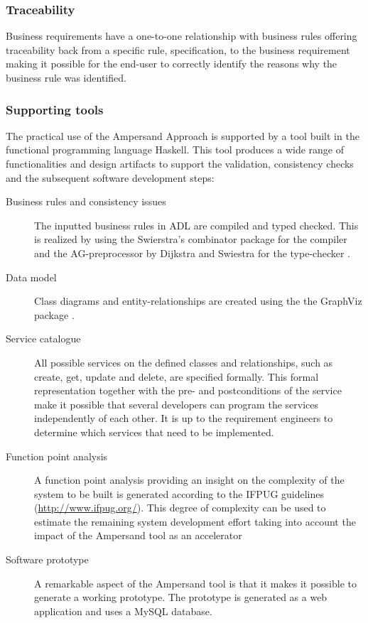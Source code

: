\subsubsection{Traceability}
Business requirements have a one-to-one relationship with business rules offering traceability back from a specific rule, specification, to the business requirement making it possible for the end-user to correctly identify the reasons why the business rule was identified.

\subsubsection{Supporting tools}
The practical use of the Ampersand Approach is supported by a tool built in the functional programming language Haskell. 
This tool produces a wide range of functionalities and design artifacts to support the validation, consistency checks and the subsequent software development steps:
\begin{description}
	\item[Business rules and consistency issues] The inputted business rules in ADL are compiled and typed checked.
	This is realized by using the Swierstra's combinator package for the compiler   and the AG-preprocessor by Dijkstra and Swiestra for the type-checker .
	\item[Data model]  Class diagrams and entity-relationships are created using the the GraphViz package . 
	\item[Service catalogue] All possible services on the defined classes and relationships, such as create, get, update and delete,  are specified formally. This formal representation together with the pre- and postconditions of the service make it possible that several developers can program the services independently of each other. 
	It is up to the requirement engineers to determine which services that need to be implemented.
	\item[Function point analysis] A function point analysis providing an insight on the complexity of the system to be built  is generated according to the IFPUG guidelines (\url{http://www.ifpug.org/}). This degree of complexity can be used to estimate the remaining system development effort taking into account the impact of the Ampersand tool as an accelerator
	\item[Software prototype] A remarkable aspect of the Ampersand tool is that it makes it possible to generate a working prototype. The prototype is generated as a web application and uses a MySQL database.
\end{description}
 
